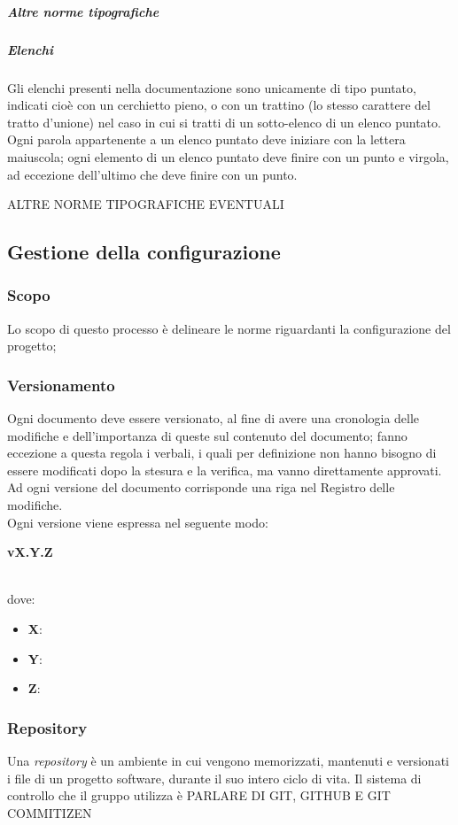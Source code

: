 \documentclass[../norme-di-progetto.tex]{subfiles}
\begin{document}
\subparagraph{Altre norme tipografiche}
\subparagraph*{Elenchi}
Gli elenchi presenti nella documentazione sono unicamente di tipo puntato, indicati cioè con un cerchietto pieno, o con un trattino (lo stesso carattere del tratto d'unione) nel caso in cui si tratti di un sotto-elenco di un elenco puntato. \\
Ogni parola appartenente a un elenco puntato deve iniziare con la lettera maiuscola; ogni elemento di un elenco puntato deve finire con un punto e virgola, ad eccezione dell'ultimo che deve finire con un punto.

ALTRE NORME TIPOGRAFICHE EVENTUALI



\subsection{Gestione della configurazione}
\subsubsection{Scopo}
Lo scopo di questo processo è delineare le norme riguardanti la configurazione del progetto;

\subsubsection{Versionamento}
Ogni documento deve essere versionato, al fine di avere una cronologia delle modifiche e dell'importanza di queste sul contenuto del documento; fanno eccezione a questa regola i verbali, i quali per definizione non hanno bisogno di essere modificati dopo la stesura e la verifica, ma vanno direttamente approvati. Ad ogni versione del documento corrisponde una riga nel Registro delle modifiche. \\
Ogni versione viene espressa nel seguente modo: \\ \centerline{\textbf{vX.Y.Z}} \\ dove:
\begin{itemize}
  \item \textbf{X}:
  \item \textbf{Y}:
  \item \textbf{Z}:
\end{itemize}

\subsubsection{Repository}
Una \textit{repository} è un ambiente in cui vengono memorizzati, mantenuti e versionati i file di un progetto software, durante il suo intero ciclo di vita. Il sistema di controllo che il gruppo utilizza è 
PARLARE DI GIT, GITHUB E GIT COMMITIZEN
\end{document}
